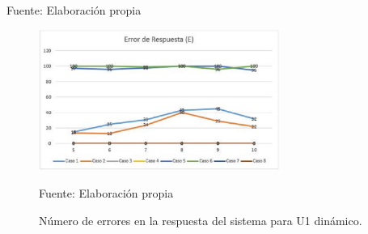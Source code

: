 \vskip -1.0cm

\begin{center}
\begin{table}[H]
\centering
\caption{\small{Resultados para el caso 6 con U1 dinámico.}}
\label{table:tabla4.23}
\vskip 0.2cm
\begin{center}
\vskip 0.2cm
{\small{Fuente: Elaboración propia}}
\end{center}
\end{table}
\end{center}

\vskip -1.0cm

\begin{figure}[H]
\begin{center}
\includegraphics[width=0.7\textwidth]{Imagenes/Cap4/image007}
\end{center}
\begin{center}
\vskip -0.5cm
\caption{\small{Número de errores en la respuesta del sistema para U1 dinámico.}}
\label{fig:figura4.7}
{\small{Fuente: Elaboración propia}}
\end{center}
\end{figure}


